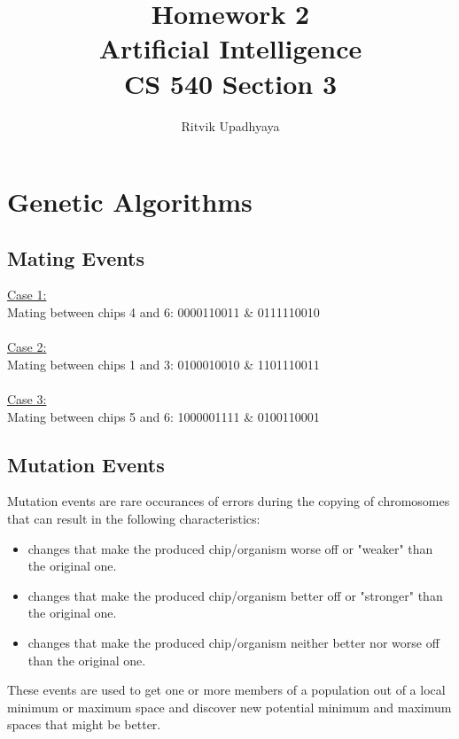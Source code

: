 \documentclass{article}
\title{\Huge Homework 2
	\\\LARGE Artificial Intelligence
	\\\LARGE CS 540 Section 3
	\vspace{2pc}
	}
\author{Ritvik Upadhyaya}
\date{}
\begin{document}
	\maketitle
	\newpage

	\tableofcontents

	\newpage
	\renewcommand\thesubsection{\thesection.\alph{subsection}}
	\section{Genetic Algorithms}
	\subsection{Mating Events}
		\underline{Case 1:}\\
		Mating between chips 4 and 6: 0000110011 \hspace{1pc}\&\hspace{1pc} 0111110010\\
		\\
		\underline{Case 2:}\\
		Mating between chips 1 and 3: 0100010010 \hspace{1pc}\&\hspace{1pc} 1101110011\\
		\\
		\underline{Case 3:}\\
		Mating between chips 5 and 6: 1000001111 \hspace{1pc}\&\hspace{1pc} 0100110001\\
	\subsection{Mutation Events}
		Mutation events are rare occurances of errors during the copying of chromosomes that can result in the following characteristics:
		\begin{itemize}
			\item changes that make the produced chip/organism worse off or "weaker" than the original one.
			\item changes that make the produced chip/organism better off or "stronger" than the original one.
			\item changes that make the produced chip/organism neither better nor worse off than the original one.
		\end{itemize}
		These events are used to get one or more members of a population out of a local minimum or maximum space and discover new potential minimum and maximum spaces that might be better.
\end{document}

